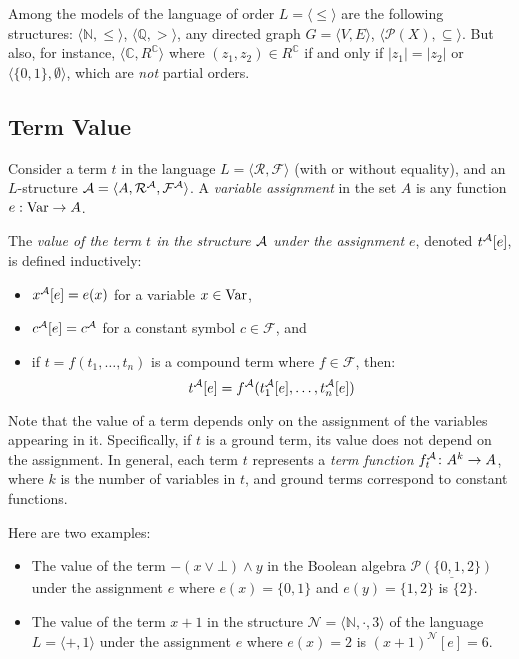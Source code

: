 \begin{example}
    Among the models of the language of order $L=\langle \leq \rangle$ are the following structures: $\langle \mathbb N,\leq\rangle$, $\langle \mathbb Q, > \rangle$, any directed graph $G=\langle V,E\rangle$, $\langle \mathcal P(X),\subseteq\rangle$. But also, for instance, $\langle \mathbb C,R^\mathbb C\rangle$ where $(z_1,z_2)\in R^\mathbb C$ if and only if $|z_1|=|z_2|$ or $\langle \{0,1\},\emptyset\rangle$, which are \emph{not} partial orders.
\end{example}

\subsection{Term Value}

Consider a term $t$ in the language $L=\langle \mathcal R,\mathcal F\rangle$ (with or without equality), and an $L$-structure $\mathcal{A}=\langle A,\mathcal R^{\mathcal{A}},\mathcal F^{\mathcal{A}}\rangle$. A \emph{variable assignment} in the set $A$ is any function $e:\operatorname{Var}\to A$.

\begin{definition}
    The \emph{value of the term $t$ in the structure $\mathcal{A}$ under the assignment $e$}, denoted $t^{\mathcal{A}}[e]$, is defined inductively:
    \begin{itemize}
        \item $x^{\mathcal{A}}[e]=e(x)$ for a variable $x\in\operatorname{Var}$,
        \item $c^{\mathcal{A}}[e]=c^{\mathcal{A}}$ for a constant symbol $c\in\mathcal F$, and
        \item if $t=f(t_1,\dots,t_n)$ is a compound term where $f\in\mathcal F$, then:
        $$
        t^{\mathcal{A}}[e]=f^{\mathcal{A}}(t_1^{\mathcal{A}}[e],\dots,t_n^{\mathcal{A}}[e])
        $$
    \end{itemize}
\end{definition}

\begin{remark}
    Note that the value of a term depends only on the assignment of the variables appearing in it. Specifically, if $t$ is a ground term, its value does not depend on the assignment.
    In general, each term $t$ represents a \emph{term function} $f_t^{\mathcal{A}}\colon A^k\to A$, where $k$ is the number of variables in $t$, and ground terms correspond to constant functions.
\end{remark}

\begin{example}
    Here are two examples:
    \begin{itemize}
        \item The value of the term $-(x\lor \bot)\land y$ in the Boolean algebra $\underline{\mathcal P(\{0,1,2\})}$ under the assignment $e$ where $e(x)=\{0,1\}$ and $e(y)=\{1,2\}$ is $\{2\}$.
        \item The value of the term $x+1$ in the structure $\mathcal N=\langle\mathbb N,\cdot,3\rangle$ of the language $L=\langle +,1\rangle$ under the assignment $e$ where $e(x)=2$ is $(x+1)^\mathcal N[e]=6$.
    \end{itemize}
\end{example}

